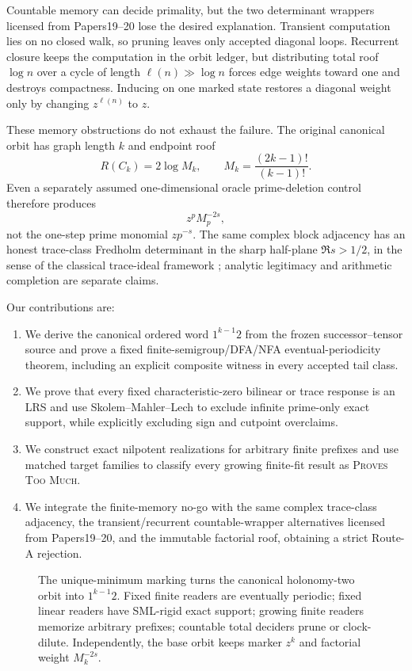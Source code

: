 Countable memory can decide primality, but the two determinant wrappers
licensed from Papers19--20 lose the desired explanation.  Transient
computation lies on no closed
walk, so pruning leaves only accepted diagonal loops.  Recurrent closure
keeps the computation in the orbit ledger, but distributing total roof
\(\log n\) over a cycle of length \(\ell(n)\gg\log n\) forces edge weights
toward one and destroys compactness.  Inducing on one marked state restores
a diagonal weight only by changing \(z^{\ell(n)}\) to \(z\).

These memory obstructions do not exhaust the failure.  The original
canonical orbit has graph length \(k\) and endpoint roof
\[
 R(C_k)=2\log M_k,\qquad
 M_k=\frac{(2k-1)!}{(k-1)!}.
\]
Even a separately assumed one-dimensional oracle prime-deletion control
therefore produces
\[
        z^pM_p^{-2s},
\]
not the one-step prime monomial \(zp^{-s}\).  The same complex block
adjacency has an honest trace-class Fredholm determinant in the sharp
half-plane \(\Re s>1/2\), in the sense of the classical trace-ideal
framework \citep{Simon1977}; analytic legitimacy and arithmetic completion
are separate claims.

Our contributions are:
\begin{enumerate}
  \item We derive the canonical ordered word \(1^{k-1}2\) from the frozen
  successor--tensor source and prove a fixed finite-semigroup/DFA/NFA
  eventual-periodicity theorem, including an explicit composite witness in
  every accepted tail class.
  \item We prove that every fixed characteristic-zero bilinear or trace
  response is an LRS and use Skolem--Mahler--Lech to exclude infinite
  prime-only exact support, while explicitly excluding sign and cutpoint
  overclaims.
  \item We construct exact nilpotent realizations for arbitrary finite
  prefixes and use matched target families to classify every growing
  finite-fit result as \textsc{Proves Too Much}.
  \item We integrate the finite-memory no-go with the same complex
  trace-class adjacency, the transient/recurrent countable-wrapper
  alternatives licensed from Papers19--20, and the immutable factorial
  roof, obtaining a strict
  Route-A rejection.
\end{enumerate}

\begin{figure}[t]
  \centering
  \resizebox{\textwidth}{!}{}
  \caption{The unique-minimum marking turns the canonical holonomy-two orbit
  into \(1^{k-1}2\).  Fixed finite readers are eventually periodic; fixed
  linear readers have SML-rigid exact support; growing finite readers
  memorize arbitrary prefixes; countable total deciders prune or
  clock-dilute.  Independently, the base orbit keeps marker \(z^k\) and
  factorial weight \(M_k^{-2s}\).}
  \label{fig:hierarchy}
\end{figure}

